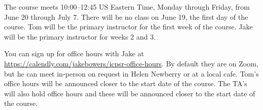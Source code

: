 The course meets 10:00--12:45 US Eastern Time, Monday through Friday, from June 20
through July 7. There will be no class on June 19, the first day of the
course. Tom will be the primary instructor for the first week of the
course. Jake will be the primary instructor for weeks 2 and 3. 


You can sign up for office hours with Jake at
\href{Calendly}{https://calendly.com/jakebowers/icpsr-office-hours}. By default
they are on Zoom, but he can meet in-person on request in Helen Newberry or at
a local cafe. Tom's office hours will be announced closer to the start date of
the course. The TA's will also hold office hours and these will be announced
closer to the start date of the course.



